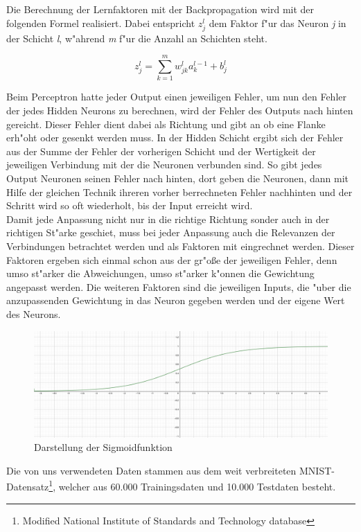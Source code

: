 \documentclass[12pt,a4paper]{scrartcl}
\begin{document}
Die Berechnung der Lernfaktoren mit der Backpropagation wird mit der folgenden Formel realisiert. Dabei entspricht $ z^l_j$ dem Faktor f"ur das Neuron \textit{j} in der Schicht \textit{l}, w"ahrend \textit{m}  f"ur die Anzahl an Schichten steht.

$$ z^l_j = \sum_{k=1} ^{m} w^l_{jk}a^{l-1}_k + b^l_j  $$

Beim Perceptron hatte jeder Output einen jeweiligen Fehler, um nun den Fehler der jedes Hidden Neurons zu berechnen, wird der Fehler des Outputs nach hinten gereicht. Dieser Fehler dient dabei als Richtung und gibt an ob eine Flanke erh"oht oder gesenkt werden muss. In der Hidden Schicht ergibt sich der Fehler aus der Summe der Fehler der vorherigen Schicht und der Wertigkeit der jeweiligen Verbindung mit der die Neuronen verbunden sind. So gibt jedes Output Neuronen seinen Fehler nach hinten, dort geben die Neuronen, dann mit Hilfe der gleichen Technik ihreren vorher berrechneten Fehler nachhinten und der Schritt wird so oft wiederholt, bis der Input erreicht wird. \\

Damit jede Anpassung nicht nur in die richtige Richtung sonder auch in der richtigen St"arke geschiet, muss bei jeder Anpassung auch die Relevanzen der Verbindungen betrachtet werden und als Faktoren mit eingrechnet werden. Dieser Faktoren ergeben sich einmal schon aus der gr"o\ss e der jeweiligen Fehler, denn umso st"arker die Abweichungen, umso st"arker k"onnen die Gewichtung angepasst werden. Die weiteren Faktoren sind die jeweiligen Inputs, die "uber die anzupassenden Gewichtung in das Neuron gegeben werden und der eigene Wert des Neurons. \\

\begin{figure}[h]
	\centering
	\includegraphics[width=14cm]{screens/wiki_sigmoid.png}
	\caption{Darstellung der Sigmoidfunktion} \label{sigmoid}
\end{figure}

Die von uns verwendeten Daten stammen aus dem weit verbreiteten MNIST-Datensatz\footnote{Modified National Institute of Standards and Technology database}, welcher aus 60.000 Trainingsdaten und 10.000 Testdaten besteht.
\end{document}
